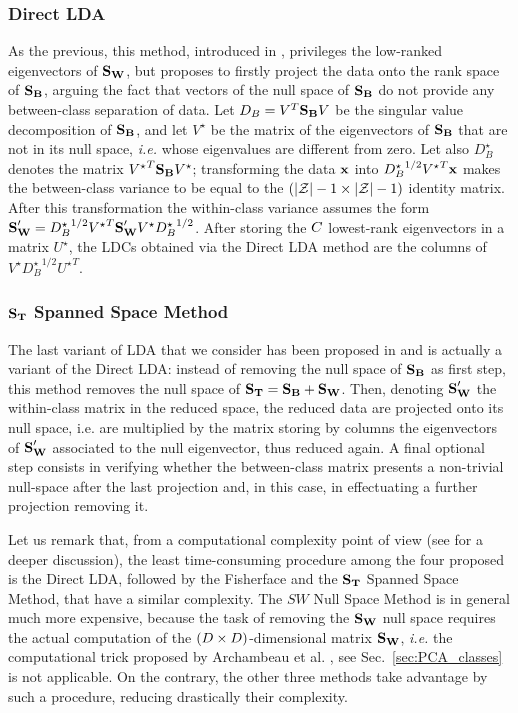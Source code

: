 \subsubsection{Direct LDA}
As the previous, this method, introduced in \cite{Yu01adirect}, privileges the low-ranked eigenvectors of $\textbf{S}_{\textbf{W}}$, but proposes to firstly project the data onto the rank space of $\textbf{S}_{\textbf{B}}$, arguing the fact that vectors of the null space of $\textbf{S}_{\textbf{B}}$ do not provide any between-class separation of data. Let $D_B=V^T\textbf{S}_{\textbf{B}} V$ be the singular value decomposition of $\textbf{S}_{\textbf{B}}$, and let $V^\star$ be the matrix of the eigenvectors of $\textbf{S}_{\textbf{B}}$ that are not in its null space, \textit{i.e.} whose eigenvalues are different from zero. Let also $D_B^\star$ denotes the matrix ${V^\star}^T\textbf{S}_{\textbf{B}} V^\star$; transforming the data $\textbf{x}$ into ${D_B^\star}^{1/2}{V^\star}^T\textbf{x}$ makes the between-class variance to be equal to   the $(\lvert \mathcal{Z} \rvert - 1 \times \lvert \mathcal{Z} \rvert - 1)$ identity matrix. After this transformation the within-class variance assumes the form $\textbf{S}_{\textbf{W}}' = {D_B^\star}^{1/2}{V^\star}^T\textbf{S}_{\textbf{W}} ' V^\star {D_B^\star}^{1/2}$. After storing the $C$ lowest-rank eigenvectors in a matrix $U^\star$, the LDCs obtained via the Direct LDA method are the columns of $V^\star{D_B^\star}^{1/2}{U^\star}^T$. 


\subsubsection{$\textbf{S}_{\textbf{T}}$ Spanned Space Method}
The last variant of LDA that we consider has been proposed in \cite{huang} and is actually a variant of the Direct LDA: instead of removing the null space of $\textbf{S}_{\textbf{B}}$ as first step, this method removes the null space of $\textbf{S}_{\textbf{T}} = \textbf{S}_{\textbf{B}} + \textbf{S}_{\textbf{W}}$. Then, denoting $\textbf{S}_{\textbf{W}}'$ the within-class matrix in the reduced space, the reduced data are projected onto its null space, i.e. are multiplied by the matrix storing by columns the eigenvectors of $\textbf{S}_{\textbf{W}}'$ associated to the null eigenvector, thus reduced again. A final optional step consists in verifying whether  the between-class matrix presents a non-trivial null-space after the last projection and, in this case, in effectuating a further projection removing it.

\begin{remark}
Let us remark that, from a computational complexity point of view (see \cite{huang} for a deeper discussion), the least time-consuming procedure among the four proposed is the Direct LDA, followed by the Fisherface and the $\textbf{S}_{\textbf{T}}$ Spanned Space Method, that have a similar complexity. The $SW$ Null Space Method is in general much more expensive, because the task of removing the $\textbf{S}_{\textbf{W}}$ null space requires the actual computation of the $(D\times D)$-dimensional matrix $\textbf{S}_{\textbf{W}}$, {\em i.e.} the computational trick proposed by Archambeau et al. \cite{TAprincipal}, see Sec.~\ref{sec:PCA_classes} is not applicable. On the contrary, the other three methods take advantage by such a procedure, reducing drastically their complexity.
\end{remark}


